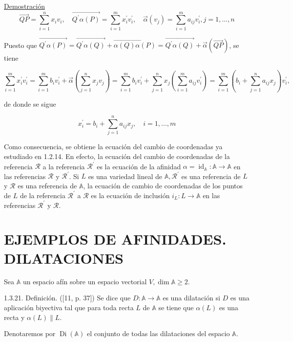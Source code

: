 \documentclass[12pt, a4paper, ones, notitlepage, openany,titlepage]{article}
\newcommand{\demostracion}{\noindent\underline{Demostración}}
\begin{document}
\demostracion
$$
\overrightarrow{Q P}=\sum_{i=1}^{n} x_{i} v_{i}, \quad \overrightarrow{Q^{\prime} \alpha(P)}=\sum_{i=1}^{m} x_{i}^{\prime} v_{i}^{\prime}, \quad \vec{\alpha}\left(v_{j}\right)=\sum_{i=1}^{m} a_{i j} v_{i}^{\prime}, j=1, \ldots, n
$$

Puesto que $\overrightarrow{Q^{\prime} \alpha(P)}=\overrightarrow{Q^{\prime} \alpha(Q)}+\overrightarrow{\alpha(Q) \alpha(P)}=\overrightarrow{Q^{\prime} \alpha(Q)}+\vec{\alpha}(\overrightarrow{Q P})$, se tiene

$$
\sum_{i=1}^{m} x_{i}^{\prime} v_{i}^{\prime}=\sum_{i=1}^{m} b_{i} v_{i}^{\prime}+\vec{\alpha}\left(\sum_{j=1}^{n} x_{j} v_{j}\right)=\sum_{i=1}^{m} b_{i} v_{i}^{\prime}+\sum_{j=1}^{n} x_{j}\left(\sum_{i=1}^{m} a_{i j} v_{i}^{\prime}\right)=\sum_{i=1}^{m}\left(b_{i}+\sum_{j=1}^{n} a_{i j} x_{j}\right) v_{i}^{\prime},
$$

de donde se sigue

$$
x_{i}^{\prime}=b_{i}+\sum_{j=1}^{n} a_{i j} x_{j}, \quad i=1, \ldots, m
$$

Como consecuencia, se obtiene la ecuación del cambio de coordenadas ya estudiado en 1.2.14. En efecto, la ecuación del cambio de coordenadas de la referencia $\mathcal{R}$ a la referencia $\mathcal{R}^{\prime}$ es la ecuación de la afinidad $\alpha=\operatorname{id}_{\mathbb{A}}: \mathbb{A} \rightarrow \mathbb{A}$ en las referencias $\mathcal{R}$ y $\mathcal{R}^{\prime}$. Si $L$ es una variedad lineal de $\mathbb{A}, \mathcal{R}^{\prime}$ es una referencia de $L$ y $\mathcal{R}$ es una referencia de $\mathbb{A}$, la ecuación de cambio de coordenadas de los puntos de $L$ de la referencia $\mathcal{R}^{\prime}$ a $\mathcal{R}$ es la ecuación de inclusión $i_{L}: L \rightarrow \mathbb{A}$ en las referencias $\mathcal{R}^{\prime}$ y $\mathcal{R}$.

\section{EJEMPLOS DE AFINIDADES. DILATACIONES}
Sea $\mathbb{A}$ un espacio afín sobre un espacio vectorial $V, \dim  \mathbb{A} \geq 2$.

1.3.21. Definición. ([11, p. 37]) Se dice que $D: \mathbb{A} \rightarrow \mathbb{A}$ es una dilatación si $D$ es una aplicación biyectiva tal que para toda recta $L$ de $\mathbb{A}$ se tiene que $\alpha(L)$ es una recta y $\alpha(L) \| L$.

Denotaremos por $\operatorname{Di}(\mathbb{A})$ el conjunto de todas las dilataciones del espacio $\mathbb{A}$.
\end{document}
